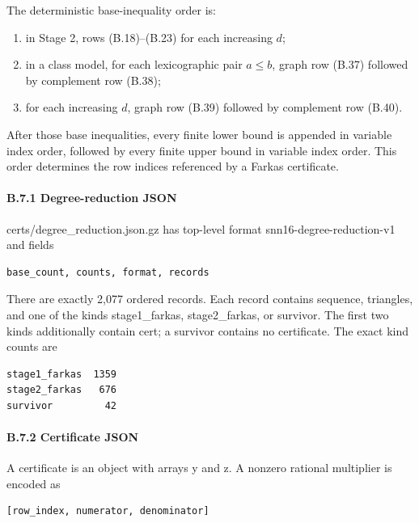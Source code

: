 \documentclass[
  english,
  11pt,
  a4paper,
]{article}
\providecommand{\tightlist}{%
  \setlength{\itemsep}{0pt}\setlength{\parskip}{0pt}}
\begin{document}
The deterministic base-inequality order is:

\begin{enumerate}
\def\labelenumi{\arabic{enumi}.}
\tightlist
\item
  in Stage 2, rows (B.18)--(B.23) for each increasing \(d\);
\item
  in a class model, for each lexicographic pair \(a\le b\), graph row
  (B.37) followed by complement row (B.38);
\item
  for each increasing \(d\), graph row (B.39) followed by complement row
  (B.40).
\end{enumerate}

After those base inequalities, every finite lower bound is appended in
variable index order, followed by every finite upper bound in variable
index order. This order determines the row indices referenced by a
Farkas certificate.

\paragraph{B.7.1 Degree-reduction
JSON}\label{b.7.1-degree-reduction-json}

certs/degree\_reduction.json.gz has top-level format
snn16-degree-reduction-v1 and fields

\begin{verbatim}
base_count, counts, format, records
\end{verbatim}

There are exactly 2,077 ordered records. Each record contains sequence,
triangles, and one of the kinds stage1\_farkas, stage2\_farkas, or
survivor. The first two kinds additionally contain cert; a survivor
contains no certificate. The exact kind counts are

\begin{verbatim}
stage1_farkas  1359
stage2_farkas   676
survivor         42
\end{verbatim}

\paragraph{B.7.2 Certificate JSON}\label{b.7.2-certificate-json}

A certificate is an object with arrays y and z. A nonzero rational
multiplier is encoded as

\begin{verbatim}
[row_index, numerator, denominator]
\end{verbatim}
\end{document}
